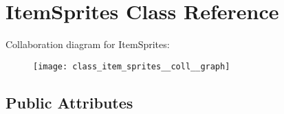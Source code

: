 \hypertarget{class_item_sprites}{}\section{Item\+Sprites Class Reference}
\label{class_item_sprites}


Collaboration diagram for Item\+Sprites\+:
\nopagebreak
\begin{figure}[H]
\begin{center}
\leavevmode
\texttt{[image: class\_item\_sprites\_\_coll\_\_graph]}
\end{center}
\end{figure}
\subsection*{Public Attributes}

